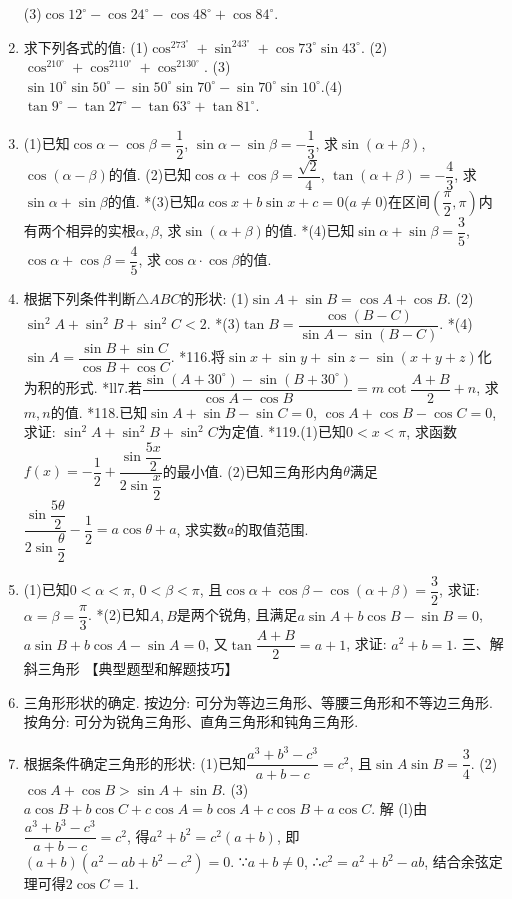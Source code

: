 \documentclass[10pt,a4paper]{article}
\begin{document}
\begin{enumerate}[1.]
(3)$\cos 12^\circ -\cos 24^\circ -\cos 48^\circ +\cos 84^\circ$.
\item 求下列各式的值:
(1)$\cos ^273^\circ +\sin ^243^\circ +\cos 73^\circ \sin 43^\circ$.		(2)$\cos ^210^\circ +\cos ^2110^\circ +\cos ^2130^\circ$.
(3)$\sin 10^\circ \sin 50^\circ -\sin 50^\circ \sin 70^\circ -\sin 70^\circ \sin 10^\circ$.(4)$\tan 9^\circ -\tan 27^\circ -\tan 63^\circ +\tan 81^\circ$.
\item (1)已知$\cos \alpha -\cos \beta =\dfrac 12$, $\sin \alpha -\sin \beta =-\dfrac 13$, 求$\sin (\alpha +\beta)$, $\cos (\alpha -\beta)$的值.
(2)已知$\cos \alpha +\cos \beta =\dfrac{\sqrt 2}4$, $\tan (\alpha +\beta)=-\dfrac 43$, 求$\sin \alpha +\sin \beta$的值.
*(3)已知$a\cos x+b\sin x+c=0$($a\ne 0$)在区间$(\dfrac{\pi }2,\pi)$内有两个相异的实根$\alpha ,\beta$, 求$\sin (\alpha +\beta)$的值.
*(4)已知$\sin \alpha +\sin \beta =\dfrac 35$, $\cos \alpha +\cos \beta =\dfrac 45$, 求$\cos \alpha \cdot \cos \beta$的值.
\item 根据下列条件判断$\triangle ABC$的形状:
(1)$\sin A+\sin B=\cos A+\cos B$.			(2)$\sin ^2A+\sin ^2B+\sin ^2C<2$.
*(3)$\tan B=\dfrac{\cos (B-C)}{\sin A-\sin (B-C)}$.			*(4)$\sin A=\dfrac{\sin B+\sin C}{\cos B+\cos C}$.
*116.将$\sin x+\sin y+\sin z-\sin (x+y+z)$化为积的形式.
*ll7.若$\dfrac{\sin (A+30^\circ)-\sin (B+30^\circ)}{\cos A-\cos B}=m\cot \dfrac{A+B}2+n$, 求$m,n$的值.
*118.已知$\sin A+\sin B-\sin C=0$, $\cos A+\cos B-\cos C=0$, 求证: $\sin ^2A+\sin ^2B+\sin ^2C$为定值.
*119.(1)已知$0<x<\pi$, 求函数$f(x)=-\dfrac 12+\dfrac{\sin \dfrac{5x}2}{2\sin \dfrac x2}$的最小值.
(2)已知三角形内角$\theta$满足$\dfrac{\sin \dfrac{5\theta }2}{2\sin \dfrac{\theta }2}-\dfrac 12=a\cos \theta +a$, 求实数$a$的取值范围.
\item (1)已知$0<\alpha <\pi$, $0<\beta <\pi$, 且$\cos \alpha +\cos \beta -\cos (\alpha +\beta)=\dfrac 32$, 求证: $\alpha =\beta =\dfrac{\pi }3$.
*(2)已知$A,B$是两个锐角, 且满足$a\sin A+b\cos B-\sin B=0$, $a\sin B+b\cos A-\sin A=0$, 又$\tan \dfrac{A+B}2=a+1$, 求证: $a^2+b=1$.
三、解斜三角形
【典型题型和解题技巧】
\item 三角形形状的确定.
按边分: 可分为等边三角形、等腰三角形和不等边三角形.
按角分: 可分为锐角三角形、直角三角形和钝角三角形.
\item 根据条件确定三角形的形状:
(1)已知$\dfrac{a^3+b^3-c^3}{a+b-c}=c^2$, 且$\sin A\sin B=\dfrac 34$.
(2)$\cos A+\cos B>\sin A+\sin B$.
(3)$a\cos B+b\cos C+c\cos A=b\cos A+c\cos B+a\cos C$.
解  (l)由$\dfrac{a^3+b^3-c^3}{a+b-c}=c^2$, 得$a^2+b^2=c^2(a+b)$, 即$(a+b)(a^2-ab+b^2-c^2)=0$.
∵$a+b\ne 0$, ∴$c^2=a^2+b^2-ab$, 结合余弦定理可得$2\cos C=1$.

\end{enumerate}
\end{document}
